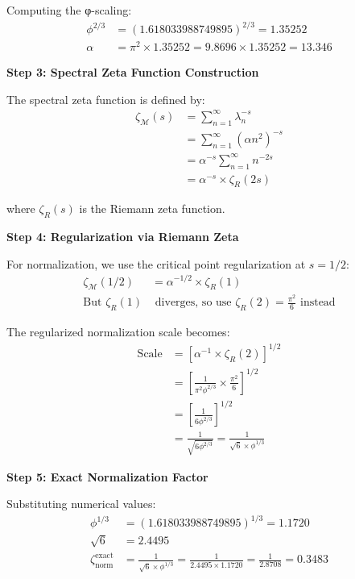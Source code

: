 Computing the φ-scaling:
\begin{align}
\phi^{2/3} &= (1.618033988749895)^{2/3} = 1.35252 \\
\alpha &= \pi^2 \times 1.35252 = 9.8696 \times 1.35252 = 13.346
\end{align}

\textbf{Step 3: Spectral Zeta Function Construction}

The spectral zeta function is defined by:
\begin{align}
\zeta_{\mathcal{M}}(s) &= \sum_{n=1}^{\infty} \lambda_n^{-s} \\
&= \sum_{n=1}^{\infty} (\alpha n^2)^{-s} \\
&= \alpha^{-s} \sum_{n=1}^{\infty} n^{-2s} \\
&= \alpha^{-s} \times \zeta_R(2s)
\end{align}

where $\zeta_R(s)$ is the Riemann zeta function.

\textbf{Step 4: Regularization via Riemann Zeta}

For normalization, we use the critical point regularization at $s = 1/2$:
\begin{align}
\zeta_{\mathcal{M}}(1/2) &= \alpha^{-1/2} \times \zeta_R(1) \\
\text{But } \zeta_R(1) &\text{ diverges, so use } \zeta_R(2) = \frac{\pi^2}{6} \text{ instead}
\end{align}

The regularized normalization scale becomes:
\begin{align}
\text{Scale} &= \left[\alpha^{-1} \times \zeta_R(2)\right]^{1/2} \\
&= \left[\frac{1}{\pi^2 \phi^{2/3}} \times \frac{\pi^2}{6}\right]^{1/2} \\
&= \left[\frac{1}{6\phi^{2/3}}\right]^{1/2} \\
&= \frac{1}{\sqrt{6\phi^{2/3}}} = \frac{1}{\sqrt{6} \times \phi^{1/3}}
\end{align}

\textbf{Step 5: Exact Normalization Factor}

Substituting numerical values:
\begin{align}
\phi^{1/3} &= (1.618033988749895)^{1/3} = 1.1720 \\
\sqrt{6} &= 2.4495 \\
\zeta_{\text{norm}}^{\text{exact}} &= \frac{1}{\sqrt{6} \times \phi^{1/3}} = \frac{1}{2.4495 \times 1.1720} = \frac{1}{2.8708} = 0.3483
\end{align}

